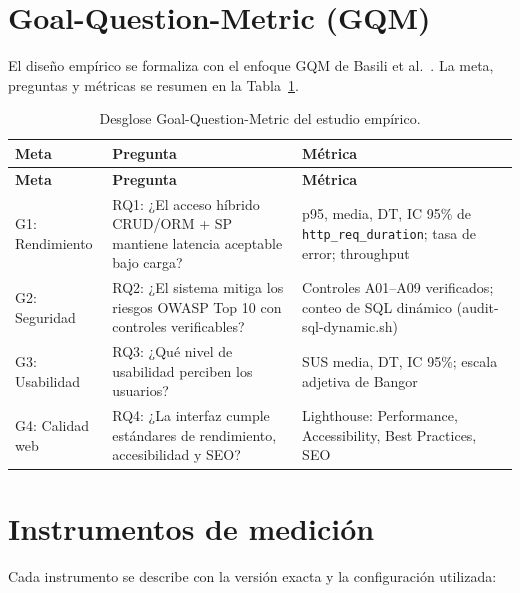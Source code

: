 \section{Goal-Question-Metric (GQM)}
\label{sec:gqm}

El diseño empírico se formaliza con el enfoque GQM de Basili et al.~\cite{basili1994}. La meta, preguntas y métricas se resumen en la Tabla~\ref{tab:gqm}.

\begin{longtable}{@{}p{3cm}p{4.5cm}p{5cm}@{}}
\caption{Desglose Goal-Question-Metric del estudio empírico.}
\label{tab:gqm}\\
\toprule
\textbf{Meta} & \textbf{Pregunta} & \textbf{Métrica} \\
\midrule
\endfirsthead
\toprule
\textbf{Meta} & \textbf{Pregunta} & \textbf{Métrica} \\
\midrule
\endhead
G1: Rendimiento & RQ1: ¿El acceso híbrido CRUD/ORM + SP mantiene latencia aceptable bajo carga? & p95, media, DT, IC 95\% de \texttt{http\_req\_duration}; tasa de error; throughput \\
\midrule
G2: Seguridad & RQ2: ¿El sistema mitiga los riesgos OWASP Top 10 con controles verificables? & Controles A01--A09 verificados; conteo de SQL dinámico (audit-sql-dynamic.sh) \\
\midrule
G3: Usabilidad & RQ3: ¿Qué nivel de usabilidad perciben los usuarios? & SUS media, DT, IC 95\%; escala adjetiva de Bangor \\
\midrule
G4: Calidad web & RQ4: ¿La interfaz cumple estándares de rendimiento, accesibilidad y SEO? & Lighthouse: Performance, Accessibility, Best Practices, SEO \\
\bottomrule
\end{longtable}

\section{Instrumentos de medición}
\label{sec:instrumentos}

Cada instrumento se describe con la versión exacta y la configuración utilizada:

